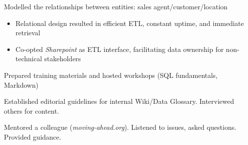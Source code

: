 \documentclass[../cv.tex]{subfiles}
\begin{document}
\begin{description}[style=multiline, leftmargin=3.5cm]
	      Modelled the relationships between entities: sales agent/customer/location
	      \begin{itemize}		      
		      \item Relational design resulted in efficient ETL, constant uptime, and immediate retrieval
		      \item Co-opted \textit{Sharepoint} as ETL interface, facilitating data ownership for non-technical stakeholders
	      \end{itemize}
	\item[Training] Prepared training materials and hosted workshops (SQL fundamentals, Markdown)
	\item[Data Glossary] Established editorial guidelines for internal Wiki/Data Glossary. Interviewed others for content.
	\item[Mentorship] Mentored a colleague (\textit{moving-ahead.org}). Listened to issues, asked questions. Provided guidance.
\end{description}
\end{document}
